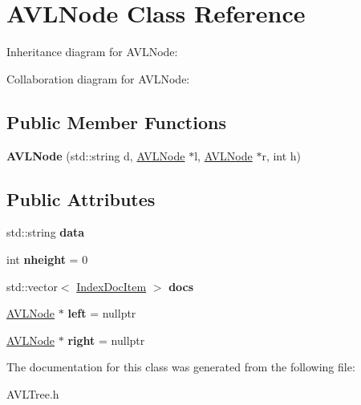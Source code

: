 \hypertarget{classAVLNode}{}\section{A\+V\+L\+Node Class Reference}
\label{classAVLNode}


Inheritance diagram for A\+V\+L\+Node\+:


Collaboration diagram for A\+V\+L\+Node\+:
\subsection*{Public Member Functions}
\begin{DoxyCompactItemize}
\item 
{\bfseries A\+V\+L\+Node} (std\+::string d, \hyperlink{classAVLNode}{A\+V\+L\+Node} $\ast$l, \hyperlink{classAVLNode}{A\+V\+L\+Node} $\ast$r, int h)\hypertarget{classAVLNode_a87e0df33d7248abe88d7744d3608fc41}{}\label{classAVLNode_a87e0df33d7248abe88d7744d3608fc41}

\end{DoxyCompactItemize}
\subsection*{Public Attributes}
\begin{DoxyCompactItemize}
\item 
std\+::string {\bfseries data}\hypertarget{classAVLNode_aaffb36365405cb1507ad3b9421a99571}{}\label{classAVLNode_aaffb36365405cb1507ad3b9421a99571}

\item 
int {\bfseries nheight} = 0\hypertarget{classAVLNode_a168a80ac0b655fe9685845e28c4c2fa1}{}\label{classAVLNode_a168a80ac0b655fe9685845e28c4c2fa1}

\item 
std\+::vector$<$ \hyperlink{classIndexDocItem}{Index\+Doc\+Item} $>$ {\bfseries docs}\hypertarget{classAVLNode_ac09676cd7c700df1fb5406a89fcbddc1}{}\label{classAVLNode_ac09676cd7c700df1fb5406a89fcbddc1}

\item 
\hyperlink{classAVLNode}{A\+V\+L\+Node} $\ast$ {\bfseries left} = nullptr\hypertarget{classAVLNode_a3aec7ddbc8d05b12a38101cb59eb2013}{}\label{classAVLNode_a3aec7ddbc8d05b12a38101cb59eb2013}

\item 
\hyperlink{classAVLNode}{A\+V\+L\+Node} $\ast$ {\bfseries right} = nullptr\hypertarget{classAVLNode_a8fc68b528d5e7ddf2b3a064b1958b285}{}\label{classAVLNode_a8fc68b528d5e7ddf2b3a064b1958b285}

\end{DoxyCompactItemize}


The documentation for this class was generated from the following file\+:\begin{DoxyCompactItemize}
\item 
A\+V\+L\+Tree.\+h\end{DoxyCompactItemize}

